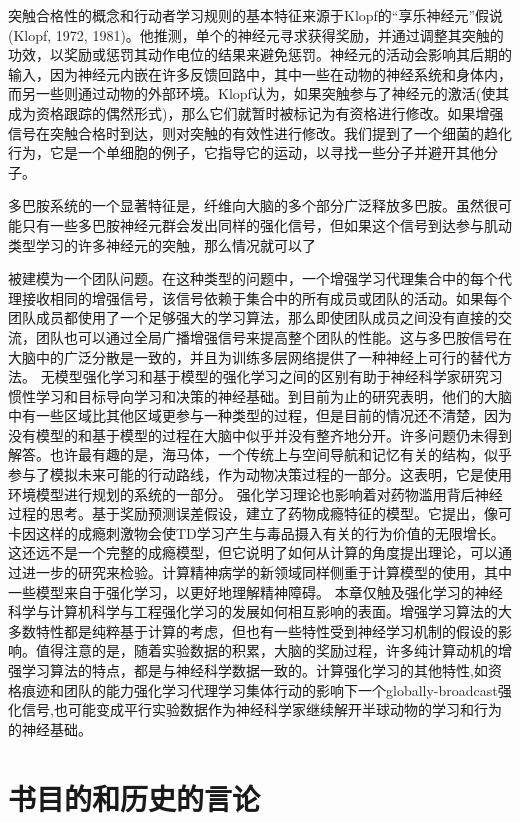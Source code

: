 突触合格性的概念和行动者学习规则的基本特征来源于Klopf的“享乐神经元”假说(Klopf, 1972, 1981)。他推测，单个的神经元寻求获得奖励，并通过调整其突触的功效，以奖励或惩罚其动作电位的结果来避免惩罚。神经元的活动会影响其后期的输入，因为神经元内嵌在许多反馈回路中，其中一些在动物的神经系统和身体内，而另一些则通过动物的外部环境。Klopf认为，如果突触参与了神经元的激活(使其成为资格跟踪的偶然形式)，那么它们就暂时被标记为有资格进行修改。如果增强信号在突触合格时到达，则对突触的有效性进行修改。我们提到了一个细菌的趋化行为，它是一个单细胞的例子，它指导它的运动，以寻找一些分子并避开其他分子。

多巴胺系统的一个显著特征是，纤维向大脑的多个部分广泛释放多巴胺。虽然很可能只有一些多巴胺神经元群会发出同样的强化信号，但如果这个信号到达参与肌动类型学习的许多神经元的突触，那么情况就可以了

被建模为一个团队问题。在这种类型的问题中，一个增强学习代理集合中的每个代理接收相同的增强信号，该信号依赖于集合中的所有成员或团队的活动。如果每个团队成员都使用了一个足够强大的学习算法，那么即使团队成员之间没有直接的交流，团队也可以通过全局广播增强信号来提高整个团队的性能。这与多巴胺信号在大脑中的广泛分散是一致的，并且为训练多层网络提供了一种神经上可行的替代方法。
无模型强化学习和基于模型的强化学习之间的区别有助于神经科学家研究习惯性学习和目标导向学习和决策的神经基础。到目前为止的研究表明，他们的大脑中有一些区域比其他区域更参与一种类型的过程，但是目前的情况还不清楚，因为没有模型的和基于模型的过程在大脑中似乎并没有整齐地分开。许多问题仍未得到解答。也许最有趣的是，海马体，一个传统上与空间导航和记忆有关的结构，似乎参与了模拟未来可能的行动路线，作为动物决策过程的一部分。这表明，它是使用环境模型进行规划的系统的一部分。
强化学习理论也影响着对药物滥用背后神经过程的思考。基于奖励预测误差假设，建立了药物成瘾特征的模型。它提出，像可卡因这样的成瘾刺激物会使TD学习产生与毒品摄入有关的行为价值的无限增长。这还远不是一个完整的成瘾模型，但它说明了如何从计算的角度提出理论，可以通过进一步的研究来检验。计算精神病学的新领域同样侧重于计算模型的使用，其中一些模型来自于强化学习，以更好地理解精神障碍。
本章仅触及强化学习的神经科学与计算机科学与工程强化学习的发展如何相互影响的表面。增强学习算法的大多数特性都是纯粹基于计算的考虑，但也有一些特性受到神经学习机制的假设的影响。值得注意的是，随着实验数据的积累，大脑的奖励过程，许多纯计算动机的增强学习算法的特点，都是与神经科学数据一致的。计算强化学习的其他特性,如资格痕迹和团队的能力强化学习代理学习集体行动的影响下一个globally-broadcast强化信号,也可能变成平行实验数据作为神经科学家继续解开半球动物的学习和行为的神经基础。

\section{书目的和历史的言论}

